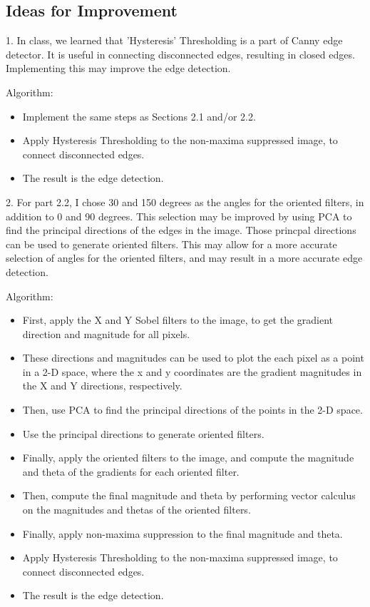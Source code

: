 \documentclass[12pt]{article}
\begin{document}
\subsection{Ideas for Improvement}
1. In class, we learned that 'Hysteresis' Thresholding is a part of Canny edge detector. It is useful in connecting disconnected edges, resulting in closed edges. Implementing this may improve the edge detection.

Algorithm:
\begin{itemize}
    \item Implement the same steps as Sections 2.1 and/or 2.2.
    \item Apply Hysteresis Thresholding to the non-maxima suppressed image, to connect disconnected edges.
    \item The result is the edge detection.
\end{itemize}

2. For part 2.2, I chose 30 and 150 degrees as the angles for the oriented filters, in addition to 0 and 90 degrees. This selection may be improved by using PCA to find the principal directions of the edges in the image. Those princpal directions can be used to generate oriented filters. This may allow for a more accurate selection of angles for the oriented filters, and may result in a more accurate edge detection.

Algorithm:
\begin{itemize}
    \item First, apply the X and Y Sobel filters to the image, to get the gradient direction and magnitude for all pixels.
    \item These directions and magnitudes can be used to plot the each pixel as a point in a 2-D space, where the x and y coordinates are the gradient magnitudes in the X and Y directions, respectively.
    \item Then, use PCA to find the principal directions of the points in the 2-D space.
    \item Use the principal directions to generate oriented filters.
    \item Finally, apply the oriented filters to the image, and compute the magnitude and theta of the gradients for each oriented filter.
    \item Then, compute the final magnitude and theta by performing vector calculus on the magnitudes and thetas of the oriented filters.
    \item Finally, apply non-maxima suppression to the final magnitude and theta.
    \item Apply Hysteresis Thresholding to the non-maxima suppressed image, to connect disconnected edges.
    \item The result is the edge detection.
\end{itemize}
\end{document}
